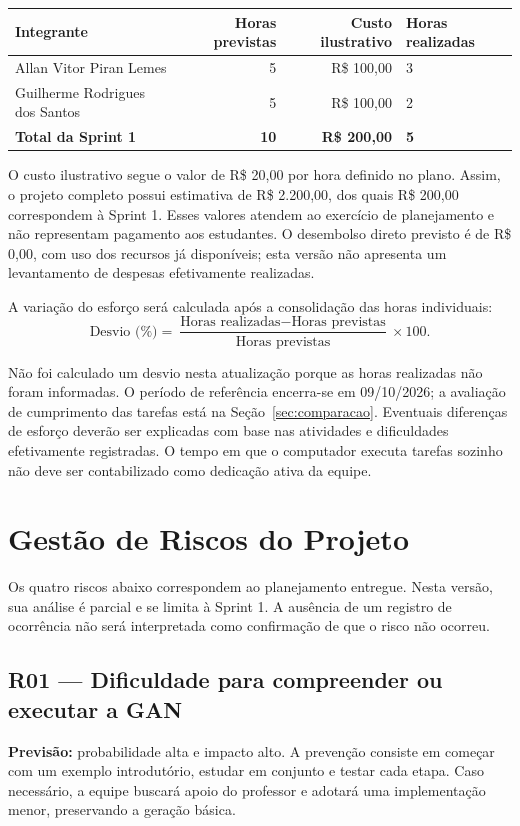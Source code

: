 \documentclass[12pt,a4paper]{article}
\begin{document}
\begin{center}
\small
\begin{tabularx}{\textwidth}{@{}YrrY@{}}
\toprule
\textbf{Integrante} & \textbf{Horas previstas} & \textbf{Custo ilustrativo} & \textbf{Horas realizadas} \\
\midrule
Allan Vitor Piran Lemes & 5 & R\$ 100,00 &  3 \\
Guilherme Rodrigues dos Santos & 5 & R\$ 100,00 & 2 \\
\midrule
\textbf{Total da Sprint 1} & \textbf{10} & \textbf{R\$ 200,00} & \textbf{5} \\
\bottomrule
\end{tabularx}
\end{center}

O custo ilustrativo segue o valor de R\$ 20,00 por hora definido no plano. Assim, o projeto completo possui estimativa de R\$ 2.200,00, dos quais R\$ 200,00 correspondem à Sprint 1. Esses valores atendem ao exercício de planejamento e não representam pagamento aos estudantes. O desembolso direto previsto é de R\$ 0,00, com uso dos recursos já disponíveis; esta versão não apresenta um levantamento de despesas efetivamente realizadas.

A variação do esforço será calculada após a consolidação das horas individuais:
\[
\text{Desvio (\%)} =
\frac{\text{Horas realizadas} - \text{Horas previstas}}
     {\text{Horas previstas}} \times 100.
\]

Não foi calculado um desvio nesta atualização porque as horas realizadas não foram informadas. O período de referência encerra-se em 09/10/2026; a avaliação de cumprimento das tarefas está na Seção~\ref{sec:comparacao}. Eventuais diferenças de esforço deverão ser explicadas com base nas atividades e dificuldades efetivamente registradas. O tempo em que o computador executa tarefas sozinho não deve ser contabilizado como dedicação ativa da equipe.

\section{Gestão de Riscos do Projeto}
Os quatro riscos abaixo correspondem ao planejamento entregue. Nesta versão, sua análise é parcial e se limita à Sprint 1. A ausência de um registro de ocorrência não será interpretada como confirmação de que o risco não ocorreu.

\subsection*{R01 — Dificuldade para compreender ou executar a GAN}
\textbf{Previsão:} probabilidade alta e impacto alto. A prevenção consiste em começar com um exemplo introdutório, estudar em conjunto e testar cada etapa. Caso necessário, a equipe buscará apoio do professor e adotará uma implementação menor, preservando a geração básica.
\end{document}
